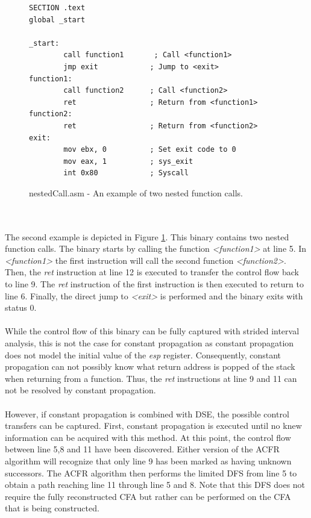 \documentclass{kththesis}
\renewcommand{\it}[1]{\textit{#1}}
\begin{document}
\begin{figure}[ht]
    \centering
\begin{tcolorbox}
\begin{verbatim}
SECTION .text
global _start

_start:
        call function1       ; Call <function1>
        jmp exit            ; Jump to <exit>
function1:
        call function2      ; Call <function2>
        ret                 ; Return from <function1>
function2:
        ret                 ; Return from <function2>
exit:
        mov ebx, 0          ; Set exit code to 0
        mov eax, 1          ; sys_exit
        int 0x80            ; Syscall
\end{verbatim}
\end{tcolorbox}
\caption{nestedCall.asm - An example of two nested function calls.}
    \label{fig:nestedCall.asm}
\end{figure}
\\ \\
The second example is depicted in Figure \ref{fig:nestedCall.asm}. This binary contains two nested function calls. The binary starts by calling the function \it{<function1>} at line 5. In \it{<function1>} the first instruction will call the second function \it{<function2>}. Then, the \it{ret} instruction at line 12 is executed to transfer the control flow back to line 9. The \it{ret} instruction of the first instruction is then executed to return to line 6. Finally, the direct jump to \it{<exit>} is performed and the binary exits with status $0$.
\\ \\
While the control flow of this binary can be fully captured with strided interval analysis, this is not the case for constant propagation as constant propagation does not model the initial value of the \it{esp} register. Consequently, constant propagation can not possibly know what return address is popped of the stack when returning from a function. Thus, the \it{ret} instructions at line 9 and 11 can not be resolved by constant propagation. 
\\ \\
However, if constant propagation is combined with DSE, the possible control transfers can be captured. First, constant propagation is executed until no knew information can be acquired with this method. At this point, the control flow between line 5,8 and 11 have been discovered. Either version of the ACFR algorithm will recognize that only line 9 has been marked as having unknown successors. The ACFR algorithm then performs the limited DFS from line 5 to obtain a path reaching line 11 through line 5 and 8. Note that this DFS does not require the fully reconstructed CFA but rather can be performed on the CFA that is being constructed.
\end{document}
